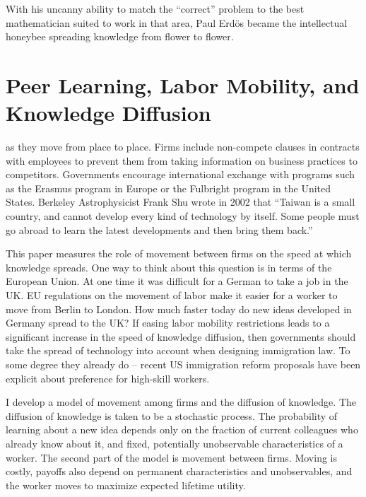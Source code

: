 \begin{savequote}[75mm]
With his uncanny ability to match the “correct” problem to the best mathematician suited to work in that area, Paul Erd{\"o}s became the intellectual honeybee spreading knowledge from flower to flower.
\end{savequote}

\chapter{Peer Learning, Labor Mobility, and Knowledge Diffusion}

 as they move from place to place. Firms include non-compete clauses in contracts with employees to prevent them from
taking information on business practices to competitors. Governments
encourage international exchange with programs such as the Erasmus
program in Europe or the Fulbright program in the United States.
Berkeley Astrophysicist Frank Shu wrote in 2002 that ``Taiwan is a small
country, and cannot develop every kind of technology by itself. Some
people must go abroad to learn the latest developments and then bring
them back.'' \citep{taiwanpanorama2002shu}

This paper measures the role of movement between firms on the speed at
which knowledge spreads. One way to think about this question is in
terms of the European Union. At one time it was difficult for a German
to take a job in the UK. EU regulations on the movement of labor make it
easier for a worker to move from Berlin to London. How much faster
today do new ideas developed in Germany spread to the UK? If easing
labor mobility restrictions leads to a significant increase in the speed
of knowledge diffusion, then governments should take the spread of
technology into account when designing immigration law. To some degree
they already do -- recent US immigration reform proposals have been
explicit about preference for high-skill workers.

I develop a model of movement among firms and the diffusion
of knowledge. The diffusion of knowledge is taken to be a stochastic
process. The probability of learning about a new idea depends only on
the fraction of current colleagues who already know about it, and fixed,
potentially unobservable characteristics of a worker. The second part of
the model is movement between firms. Moving is costly, payoffs also depend on permanent characteristics and unobservables, and the worker moves to maximize expected lifetime
utility.

